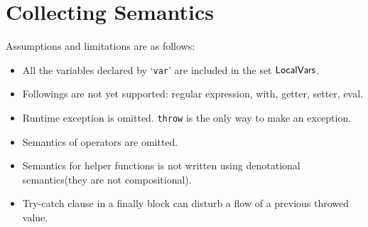 \documentclass{article}
\newcommand{\SF}[1]{\mbox{\textsf{#1}}}
\newcommand{\TT}[1]{\mbox{\texttt{#1}}}
\newcommand{\vars}{\SF{LocalVars}}
\begin{document}
\section{Collecting Semantics}
 Assumptions and limitations are as follows:
\begin{itemize}
\item All the variables declared by `\TT{var}' are included in the set $\vars$.
\item Followings are not yet supported: regular expression, with, getter, setter, eval.
\item Runtime exception is omitted. \TT{throw} is the only way to make an exception.
\item Semantics of operators are omitted.
\item Semantics for helper functions is not written using denotational semantics(they are not compositional).
\item Try-catch clause in a finally block can disturb a flow of a previous throwed value.
\end{itemize}
\end{document}
